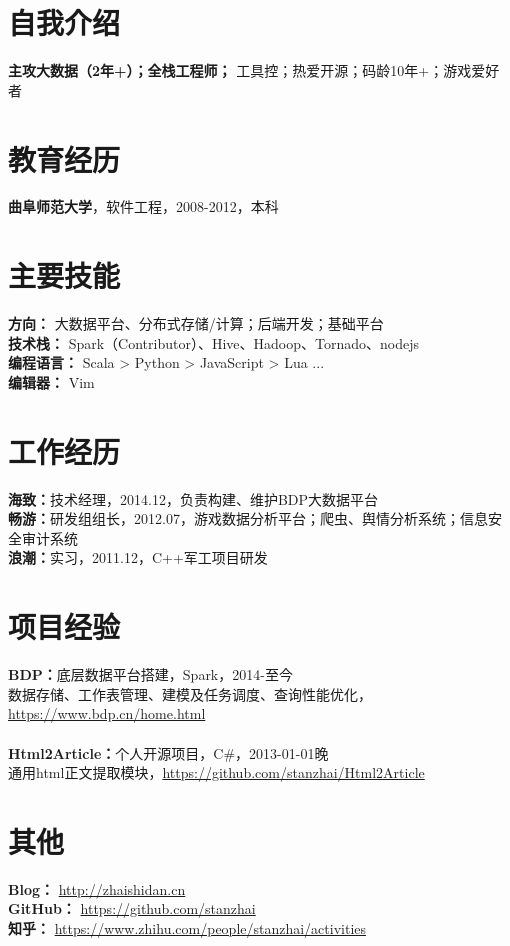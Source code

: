 \documentclass[UTF8,margin,line]{res}
\begin{document}

\begin{resume}

\section{\sc 自我介绍}
\textbf{主攻大数据（2年+）；全栈工程师；} 工具控；热爱开源；码龄10年+；游戏爱好者

\section{\sc 教育经历}
\textbf{曲阜师范大学}，软件工程，2008-2012，本科

\section{\sc 主要技能}
\textbf{方向：} 大数据平台、分布式存储/计算；后端开发；基础平台 \\
\textbf{技术栈：} Spark（Contributor）、Hive、Hadoop、Tornado、nodejs \\
\textbf{编程语言：} Scala > Python > JavaScript > Lua ... \\
\textbf{编辑器：} Vim

\section{\sc 工作经历}
\textbf{海致：}技术经理，2014.12，负责构建、维护BDP大数据平台 \\
\textbf{畅游：}研发组组长，2012.07，游戏数据分析平台；爬虫、舆情分析系统；信息安全审计系统 \\
\textbf{浪潮：}实习，2011.12，C++军工项目研发

\section{\sc 项目经验}
\textbf{BDP：}底层数据平台搭建，Spark，2014-至今 \\
数据存储、工作表管理、建模及任务调度、查询性能优化， \url{https://www.bdp.cn/home.html} \\
\\
\textbf{Html2Article：}个人开源项目，C\#，2013-01-01晚 \\
通用html正文提取模块，\url{https://github.com/stanzhai/Html2Article} \\

\section{\sc 其他}
\textbf{Blog：} \url{http://zhaishidan.cn} \\
\textbf{GitHub：} \url{https://github.com/stanzhai} \\
\textbf{知乎：} \url{https://www.zhihu.com/people/stanzhai/activities} \\

\end{resume}
\end{document}
